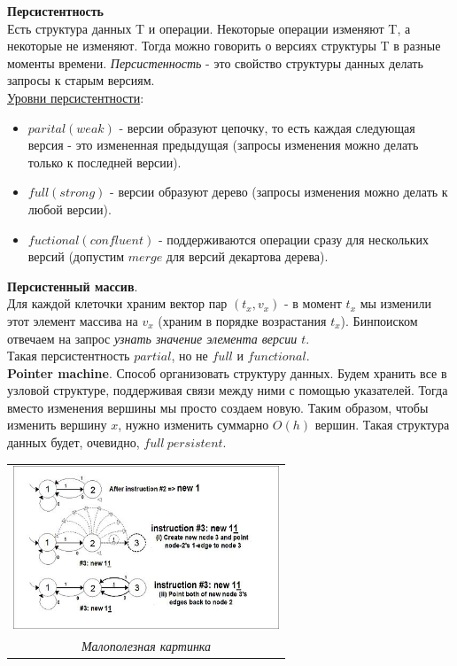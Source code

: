 \documentclass{article}
\newcommand{\tu}[1]{\underline{#1}}
\newcommand{\tb}[1]{\textbf{#1}}
\newcommand{\ti}[1]{\textit{#1}}
\begin{document}
{\Large\tb{Персистентность}} \\

Есть структура данных T и операции. Некоторые операции изменяют T, а некоторые не изменяют. Тогда можно говорить о версиях структуры T в разные моменты времени. \ti{Персистенность} - это свойство структуры данных делать запросы к старым версиям. \\

\tu{Уровни персистентности}:

\begin{itemize}

\item $parital (weak)$ - версии образуют цепочку, то есть каждая следующая версия - это измененная предыдущая (запросы изменения можно делать только к последней версии). \\
\item $full (strong)$ - версии образуют дерево (запросы изменения можно делать к любой версии). \\
\item  $fuctional (confluent)$ - поддерживаются операции сразу для нескольких версий (допустим $merge$ для версий декартова дерева). \\

\end{itemize} 

\tb{Персистенный массив}. \\

Для каждой клеточки храним вектор пар $(t_x, v_x)$ - в момент $t_x$ мы изменили этот элемент массива на $v_x$ (храним в порядке возрастания $t_x$). Бинпоиском отвечаем на запрос \ti{узнать значение элемента версии $t$}. \\

Такая персистентность $partial$, но не $full$ и $functional$. \\

\tb{Pointer machine}. Способ организовать структуру данных. Будем хранить все в узловой структуре, поддерживая связи между ними с помощью указателей. Тогда вместо изменения вершины мы просто создаем новую. Таким образом, чтобы изменить вершину $x$, нужно изменить суммарно $O(h)$ вершин. Такая структура данных будет, очевидно, $full\ persistent$.


\begin{centering}
\begin{tabular}{c}
    \includegraphics[width=300px]{pictures/pointer_machine.jpeg} \\
    \textit{Малополезная картинка}
\end{tabular}
\end{centering}
\end{document}
